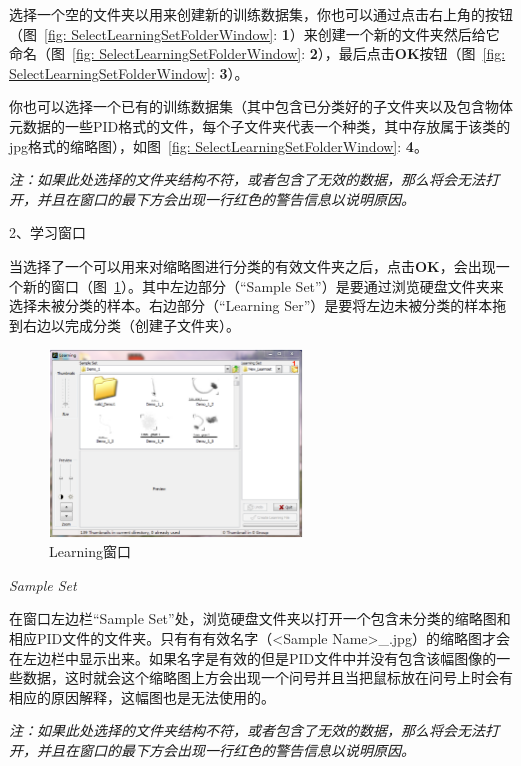 \documentclass[12pt]{article}
\begin{document}
选择一个空的文件夹以用来创建新的训练数据集，你也可以通过点击右上角的按钮（图~\ref{fig: SelectLearningSetFolderWindow}: {\color{red}\textbf{1}}）来创建一个新的文件夹然后给它命名（图~\ref{fig: SelectLearningSetFolderWindow}: {\color{red}\textbf{2}}），最后点击\textbf{OK}按钮（图~\ref{fig: SelectLearningSetFolderWindow}: {\color{red}\textbf{3}}）。

你也可以选择一个已有的训练数据集（其中包含已分类好的子文件夹以及包含物体元数据的一些PID格式的文件，每个子文件夹代表一个种类，其中存放属于该类的jpg格式的缩略图），如图~\ref{fig: SelectLearningSetFolderWindow}: {\color{red}\textbf{4}}。

{\color{blue}\textit{注：如果此处选择的文件夹结构不符，或者包含了无效的数据，那么将会无法打开，并且在窗口的最下方会出现一行红色的警告信息以说明原因。}}

2、学习窗口

当选择了一个可以用来对缩略图进行分类的有效文件夹之后，点击\textbf{OK}，会出现一个新的窗口（图~\ref{fig: LearningWindow}）。其中左边部分（“Sample Set”）是要通过浏览硬盘文件夹来选择未被分类的样本。右边部分（“Learning Ser”）是要将左边未被分类的样本拖到右边以完成分类（创建子文件夹）。

\begin{figure}[!ht]
\centering
\includegraphics[width=0.6\textwidth]{LearningWindow.eps}
\caption{Learning窗口}
\label{fig: LearningWindow}
\end{figure} 

\textit{Sample Set}

在窗口左边栏“Sample Set”处，浏览硬盘文件夹以打开一个包含未分类的缩略图和相应PID文件的文件夹。只有有有效名字（<Sample Name>\_<Item Number>.jpg）的缩略图才会在左边栏中显示出来。如果名字是有效的但是PID文件中并没有包含该幅图像的一些数据，这时就会这个缩略图上方会出现一个问号并且当把鼠标放在问号上时会有相应的原因解释，这幅图也是无法使用的。

\textit{注：如果此处选择的文件夹结构不符，或者包含了无效的数据，那么将会无法打开，并且在窗口的最下方会出现一行红色的警告信息以说明原因。}
\end{document}

